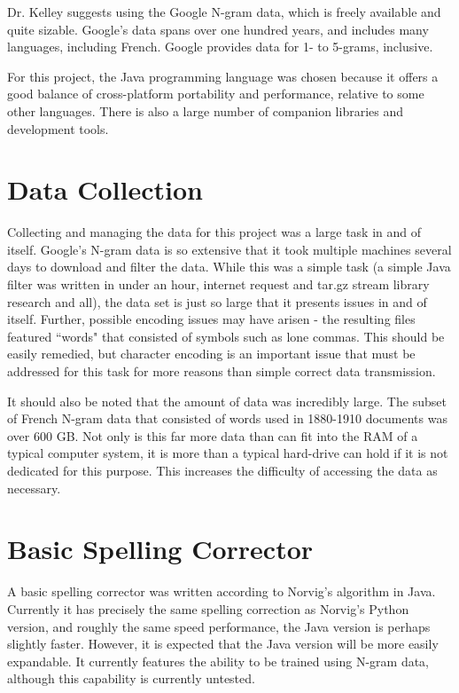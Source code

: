\documentclass[11pts]{article}
\begin{document}
Dr. Kelley suggests using the Google N-gram data, which is freely available and quite sizable. Google's data spans over one hundred years, and includes many languages, including French. Google provides data for 1- to 5-grams, inclusive.

For this project, the Java programming language was chosen because it offers a good balance of cross-platform portability and performance, relative to some other languages. There is also a large number of companion libraries and development tools.

\section{Data Collection}
Collecting and managing the data for this project was a large task in and of itself. Google's N-gram data is so extensive that it took multiple machines several days to download and filter the data. While this was a simple task (a simple Java filter was written in under an hour, internet request and tar.gz stream library research and all), the data set is just so large that it presents issues in and of itself. Further, possible encoding issues may have arisen - the resulting files featured ``words" that consisted of symbols such as lone commas. This should be easily remedied, but character encoding is an important issue that must be addressed for this task for more reasons than simple correct data transmission.

It should also be noted that the amount of data was incredibly large. The subset of French N-gram data that consisted of words used in 1880-1910 documents was over 600 GB. Not only is this far more data than can fit into the RAM of a typical computer system, it is more than a typical hard-drive can hold if it is not dedicated for this purpose. This increases the difficulty of accessing the data as necessary.

\section{Basic Spelling Corrector}
A basic spelling corrector was written according to Norvig's algorithm in Java. Currently it has precisely the same spelling correction as Norvig's Python version, and roughly the same speed performance, the Java version is perhaps slightly faster. However, it is expected that the Java version will be more easily expandable. It currently features the ability to be trained using N-gram data, although this capability is currently untested.
\end{document}
